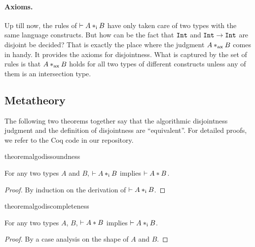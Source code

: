 
\paragraph{Axioms.} Up till now, the rules of $ \vdash A *_\textnormal{i} B $ have only
taken care of two types with the same language constructs. But how can be the
fact that $\texttt{Int}$ and $\texttt{Int} \to \texttt{Int}$ are disjoint be decided?
That is exactly the place where the judgment $ A *_\textnormal{ax} B $ comes in handy.
It provides the axioms for disjointness. What is captured by the set of rules is
that $ A *_\textnormal{ax} B $ holds for all two types of different constructs unless
any of them is an intersection type.

\subsection{Metatheory}

The following two theorems together say that the algorithmic disjointness
judgment and the definition of disjointness are ``equivalent''. For detailed
proofs, we refer to the Coq code in our repository.

\begin{restatable}{theorem}{algodissoundness}
  \label{theorem:soundness}

  For any two types $A$ and $B$, $\vdash A *_\textnormal{i} B$ implies $\vdash A * B$.
\end{restatable}

\begin{proof}
  By induction on the derivation of $\vdash A *_\textnormal{i} B$.
\end{proof}

\begin{restatable}{theorem}{algodiscompleteness}
  \label{theorem:completeness}

  For any two types $A$, $B$, $\vdash A * B$ implies $\vdash A *_\textnormal{i} B$.
\end{restatable}

\begin{proof}
  By a case analysis on the shape of $A$ and $B$.
\end{proof}
